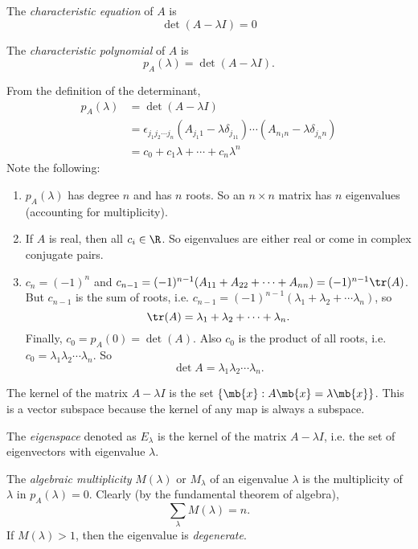 \documentclass[a4paper]{article}
\begin{document}
\begin{defi}
  The \emph{characteristic equation} of $A$ is
  \[
  \det(A - \lambda I) = 0
  \]
\end{defi}

\begin{defi}
  The \emph{characteristic polynomial} of $A$ is
  \[
  p_A(\lambda) = \det(A - \lambda I).
  \]
\end{defi}

From the definition of the determinant,
\begin{align*}
  p_A(\lambda) &= \det(A - \lambda I)\\
  &= \epsilon_{j_1j_2\cdots j_n} (A_{j_1 1} - \lambda\delta_{j_11})\cdots (A_{n_1 n} - \lambda\delta_{j_nn})\\
  &= c_0 + c_1\lambda + \cdots + c_n\lambda^n
\end{align*}
Note the following:
\begin{enumerate}
\item $p_A(\lambda)$ has degree $n$ and has $n$ roots. So an $n\times n$ matrix has $n$ eigenvalues (accounting for multiplicity).
\item If $A$ is real, then all $c_i\in \R$. So eigenvalues are either real or come in complex conjugate pairs.
\item $c_n = (-1)^n$ and $c_{n - 1} = (-1)^{n - 1}(A_{11} + A_{22} + \cdots + A_{nn}) = (-1)^{n - 1}\tr(A)$. But $c_{n -1}$ is the sum of roots, i.e. $c_{n - 1}= (-1)^{n - 1}(\lambda_1 + \lambda_2 + \cdots \lambda_n)$, so
\[
\tr(A) = \lambda_1 + \lambda_2 + \cdots + \lambda_n.
\]
Finally, $c_0 = p_A(0) = \det(A)$. Also $c_0$ is the product of all roots, i.e. $c_0 = \lambda_1\lambda_2\cdots \lambda_n$. So
\[
\det A = \lambda_1\lambda_2\cdots \lambda_n.
\]
\end{enumerate}

The kernel of the matrix $A - \lambda I$ is the set $\{\mb{x}: A\mb{x} = \lambda\mb{x}\}$. This is a vector subspace because the kernel of any map is always a subspace.

\begin{defi}[Eigenspace]
  The \emph{eigenspace} denoted as $E_\lambda$ is the kernel of the matrix $A - \lambda I$, i.e. the set of eigenvectors with eigenvalue $\lambda$.
\end{defi}

\begin{defi}
  The \emph{algebraic multiplicity} $M(\lambda)$ or $M_\lambda$ of an eigenvalue $\lambda$ is the multiplicity of $\lambda$ in $p_A(\lambda) = 0$. Clearly (by the fundamental theorem of algebra),
  \[
  \sum_\lambda M(\lambda) = n.
  \]
  If $M(\lambda) > 1$, then the eigenvalue is \emph{degenerate}.
\end{defi}
\end{document}
